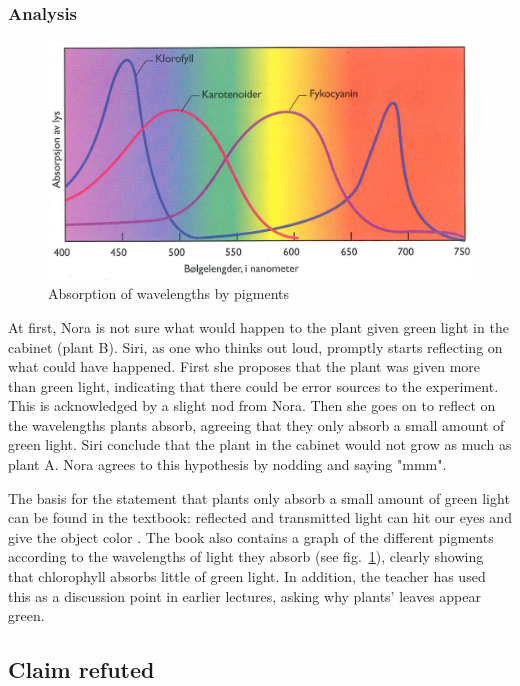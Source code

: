 \subsubsection*{Analysis}
\begin{figure}
\centering
\includegraphics[width=\textwidth]{img/dataandanalasys/absorbtion.png}
\caption{Absorption of wavelengths by pigments \citep{bios}}
\label{fig:absorption}
\end{figure}
At first, Nora is not sure what would happen to the plant given green light in the cabinet (plant B). Siri, as one who thinks out loud, promptly starts reflecting on what could have happened. First she proposes that the plant was given more than green light, indicating that there could be error sources to the experiment. This is acknowledged by a slight nod from Nora. Then she goes on to reflect on the wavelengths plants absorb, agreeing that they only absorb a small amount of green light. Siri conclude that the plant in the cabinet would not grow as much as plant A. Nora agrees to this hypothesis by nodding and saying "mmm". 

The basis for the statement that plants only absorb a small amount of green light can be found in the textbook: reflected and transmitted light can hit our eyes and give the object color \citep[pg. 103]{bios}. The book also contains a graph of the different pigments according to the wavelengths of light they absorb (see fig.~\ref{fig:absorption}), clearly showing that chlorophyll absorbs little of green light. In addition, the teacher has used this as a discussion point in earlier lectures, asking why plants' leaves appear green. 

\subsection{Claim refuted}


